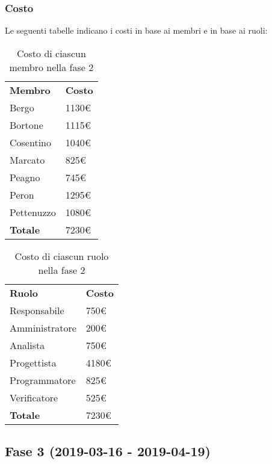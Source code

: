 	\subsubsection{Costo}
		Le seguenti tabelle indicano i costi in base ai membri e in base ai ruoli:	
		\begin{table}[h]
			\centering
			\begin{tabular}{| l | l |}
				\rowcolor{LightBlue}
				\textbf{\color{white}Membro}
				& \textbf{\color{white}Costo}\\
			
				Bergo				& 1130€\\
				Bortone			& 1115€\\
				Cosentino		& 1040€\\
				Marcato			& 825€\\
				Peagno				& 745€\\
				Peron				& 1295€\\
				Pettenuzzo		& 1080€\\ \hline
				\textbf{Totale} & 7230€\\ \hline
			\end{tabular}
			\caption{Costo di ciascun membro nella fase 2}
		\end{table}
		
		\begin{table}[h]
			\centering
			\begin{tabular}{| l | l |}
				\rowcolor{LightBlue}
				\textbf{\color{white}Ruolo}
				& \textbf{\color{white}Costo}\\
			
				Responsabile 		& 750€\\
				Amministratore 	& 200€\\
				Analista 				& 750€\\			
				Progettista 			& 4180€\\
				Programmatore 		& 825€\\
				Verificatore 		& 525€\\ \hline
				\textbf{Totale} 	& 7230€\\ \hline
			\end{tabular}		
			\caption{Costo di ciascun ruolo nella fase 2}
		\end{table}
		
\newpage
\subsection{Fase 3 (2019-03-16 - 2019-04-19)}

